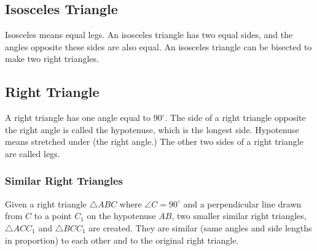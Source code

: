 \documentclass[12pt,a4paper]{article}
\begin{document}
\subsection*{Isosceles Triangle}
Isosceles means equal legs. An isosceles triangle has two equal sides, and the angles opposite these sides are also equal. An isosceles triangle can be bisected to make two right triangles.

\begin{center}
\end{center}

\subsection*{Right Triangle}
A right triangle has one angle equal to $90^\circ$. The side of a right triangle opposite the right angle is called the hypotenuse, which is the longest side. Hypotenuse means stretched under (the right angle.) The other two sides of a right triangle are called legs.

\begin{center}
\end{center}

\subsubsection*{Similar Right Triangles}
Given a right triangle \( \triangle ABC \) where \( \angle C = 90^\circ \) and a perpendicular line drawn from \( C \) to a point \( C_1 \) on the hypotenuse \( AB \), two smaller similar right triangles, \( \triangle ACC_1 \) and \( \triangle BCC_1 \) are created. They are similar (same angles and side lengths in proportion) to each other and to the original right triangle.
\end{document}
